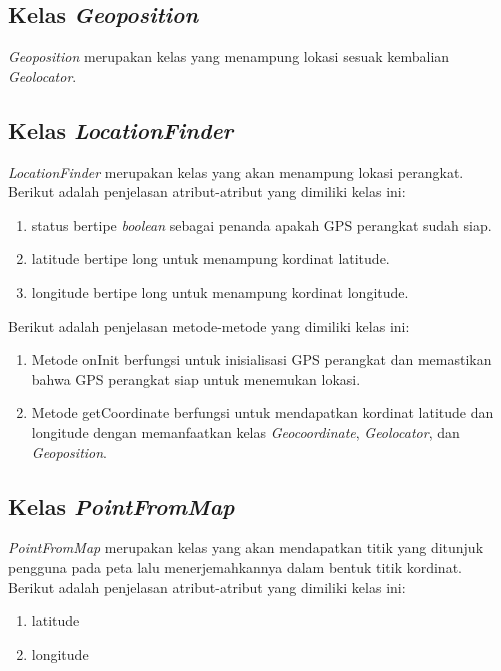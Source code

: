 \subsection{Kelas \textit{Geoposition}}
\label{lab:Kelas Geoposition}
\hspace{0.5cm} \textit{Geoposition} merupakan kelas yang menampung lokasi sesuak kembalian \textit{Geolocator}.

\subsection{Kelas \textit{LocationFinder}}
\label{lab:Kelas LocationFinder}
\hspace{0.5cm} \textit{LocationFinder} merupakan kelas yang akan menampung lokasi perangkat. Berikut adalah penjelasan atribut-atribut yang dimiliki kelas ini:
\begin{enumerate}
	\item status bertipe \textit{boolean} sebagai penanda apakah GPS perangkat sudah siap.
	\item latitude bertipe long untuk menampung kordinat latitude.
	\item longitude bertipe long untuk menampung kordinat longitude.
\end{enumerate}

Berikut adalah penjelasan metode-metode yang dimiliki kelas ini:
\begin{enumerate}
	\item Metode onInit berfungsi untuk inisialisasi GPS perangkat dan memastikan bahwa GPS perangkat siap untuk menemukan lokasi.
	\item Metode getCoordinate berfungsi untuk mendapatkan kordinat latitude dan longitude dengan memanfaatkan kelas \textit{Geocoordinate}, \textit{Geolocator}, dan \textit{Geoposition}.   
\end{enumerate}

\subsection{Kelas \textit{PointFromMap}}
\label{lab:Kelas PointFromMap}
\hspace{0.5cm} \textit{PointFromMap} merupakan kelas yang akan mendapatkan titik yang ditunjuk pengguna pada peta lalu menerjemahkannya dalam bentuk titik kordinat. Berikut adalah penjelasan atribut-atribut yang dimiliki kelas ini:
\begin{enumerate}
	\item latitude
	\item longitude
\end{enumerate}

